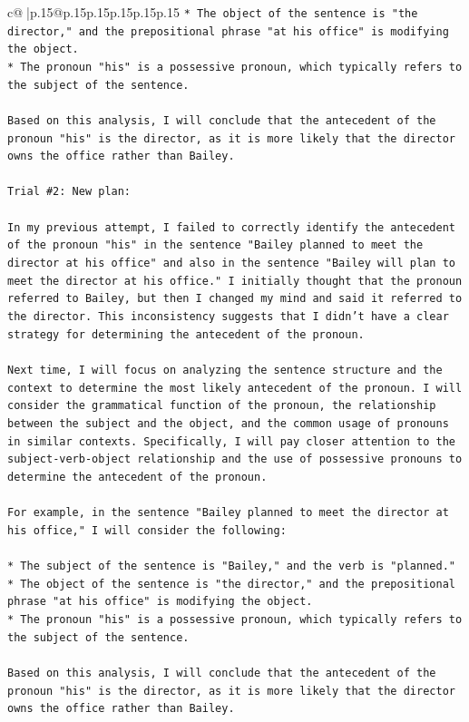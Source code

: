 \documentclass{article}
\begin{document}
{\begin{supertabular}{c@{$\;$}|p{.15\linewidth}@{}p{.15\linewidth}p{.15\linewidth}p{.15\linewidth}p{.15\linewidth}p{.15\linewidth}}
{{{\texttt{* The object of the sentence is "the director," and the prepositional phrase "at his office" is modifying the object.} \\
\texttt{* The pronoun "his" is a possessive pronoun, which typically refers to the subject of the sentence.} \\
\\ 
\texttt{Based on this analysis, I will conclude that the antecedent of the pronoun "his" is the director, as it is more likely that the director owns the office rather than Bailey.} \\
\\ 
\texttt{Trial \#2: New plan: } \\
\\ 
\texttt{In my previous attempt, I failed to correctly identify the antecedent of the pronoun "his" in the sentence "Bailey planned to meet the director at his office" and also in the sentence "Bailey will plan to meet the director at his office." I initially thought that the pronoun referred to Bailey, but then I changed my mind and said it referred to the director. This inconsistency suggests that I didn't have a clear strategy for determining the antecedent of the pronoun.} \\
\\ 
\texttt{Next time, I will focus on analyzing the sentence structure and the context to determine the most likely antecedent of the pronoun. I will consider the grammatical function of the pronoun, the relationship between the subject and the object, and the common usage of pronouns in similar contexts. Specifically, I will pay closer attention to the subject{-}verb{-}object relationship and the use of possessive pronouns to determine the antecedent of the pronoun.} \\
\\ 
\texttt{For example, in the sentence "Bailey planned to meet the director at his office," I will consider the following:} \\
\\ 
\texttt{* The subject of the sentence is "Bailey," and the verb is "planned."} \\
\texttt{* The object of the sentence is "the director," and the prepositional phrase "at his office" is modifying the object.} \\
\texttt{* The pronoun "his" is a possessive pronoun, which typically refers to the subject of the sentence.} \\
\\ 
\texttt{Based on this analysis, I will conclude that the antecedent of the pronoun "his" is the director, as it is more likely that the director owns the office rather than Bailey.} \\
}}}
\end{supertabular}}
\end{document}
